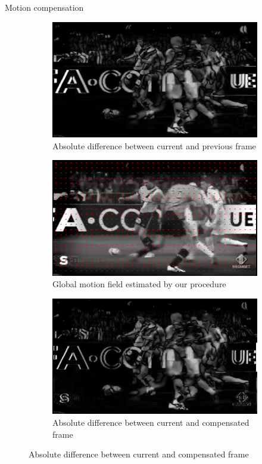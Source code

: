 \documentclass[aspectratio=1610,xcolor=dvipsnames]{beamer}
\begin{document}
\begin{frame}{Motion compensation}
\begin{figure}[htbp]
        \begin{subfigure}[b]{0.3\textwidth}
            \centering
            \includegraphics[width=\textwidth]{images/dp-curr_prev_diff.png}
            \caption{Absolute difference between current and previous frame}
            \label{fig:dp-diff-curr-prev}
        \end{subfigure}
        \hfill
        \begin{subfigure}[b]{0.3\textwidth}
            \includegraphics[width=\textwidth]{images/dp-model_motion_field.png}
            \caption{Global motion field estimated by our procedure}
            \label{fig:dp-est-mf}
        \end{subfigure}
        \hfill
        \begin{subfigure}[b]{0.3\textwidth}
            \includegraphics[width=\textwidth]{images/dp-curr_comp_diff.png}
            \caption{Absolute difference between current and compensated frame}
            \label{fig:dp-diff-curr-comp}
        \end{subfigure}
    

\end{figure}
\end{frame}
\end{document}
